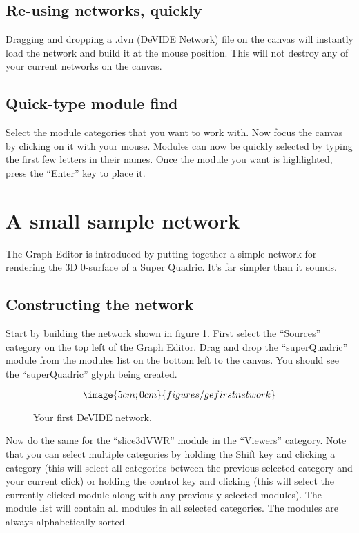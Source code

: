\subsection{Re-using networks, quickly}
Dragging and dropping a .dvn (DeVIDE Network) file on the canvas will
instantly load the network and build it at the mouse position.  This
will not destroy any of your current networks on the canvas.

\subsection{Quick-type module find}
Select the module categories that you want to work with.  Now focus
the canvas by clicking on it with your mouse.  Modules can now be
quickly selected by typing the first few letters in their names.  Once
the module you want is highlighted, press the ``Enter'' key to place
it.

\section{A small sample network}
The Graph Editor is introduced by putting together a simple network for
rendering the 3D 0-surface of a Super Quadric.  It's far simpler than
it sounds.

\subsection{Constructing the network}
Start by building the network shown in figure \ref{figGFN}.  First
select the ``Sources'' category on the top left of the Graph Editor.
Drag and drop the ``superQuadric'' module from the modules list on the
bottom left to the canvas.  You should see the ``superQuadric'' glyph
being created.

\begin{figure}
$$\image{5cm;0cm}{figures/gefirstnetwork}$$
\caption{Your first DeVIDE network.}\label{figGFN}
\end{figure}

Now do the same for the ``slice3dVWR'' module in the ``Viewers''
category.  Note that you can select multiple categories by holding the
Shift key and clicking a category (this will select all categories between the
previous selected category and your current click) or holding the
control key and clicking (this will select the currently clicked
module along with any previously selected modules).  The module list
will contain all modules in all selected categories.  The modules are
always alphabetically sorted.

